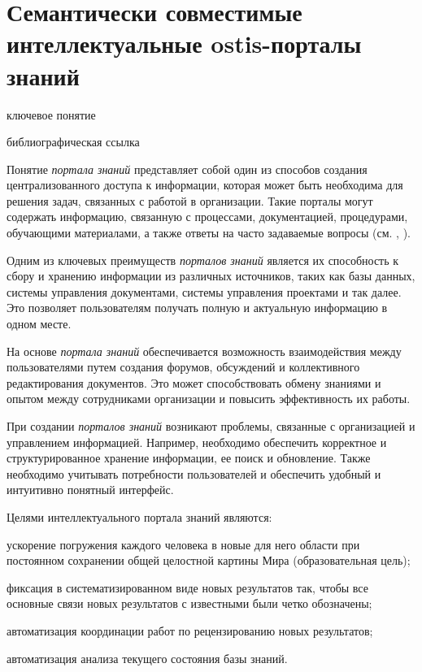 \section{Семантически совместимые интеллектуальные ostis-порталы знаний}
{\label{sec_ostis_scientific_portal}} 

\begin{SCn}

\bigskip

\begin{scnrelfromlist}{ключевое понятие}
\end{scnrelfromlist}


\begin{scnrelfromlist}{библиографическая ссылка}
\end{scnrelfromlist}

\end{SCn}

Понятие \textit{портала знаний} представляет собой один из способов создания централизованного доступа к информации, которая может быть необходима для решения задач, связанных с работой в организации. Такие порталы могут содержать информацию, связанную с процессами, документацией, процедурами, обучающими материалами, а также ответы на часто задаваемые вопросы (см. , ).

Одним из ключевых преимуществ \textit{порталов знаний} является их способность к сбору и хранению информации из различных источников, таких как базы данных, системы управления документами, системы управления проектами и так далее. Это позволяет пользователям получать полную и актуальную информацию в одном месте.

На основе \textit{портала знаний} обеспечивается возможность взаимодействия между пользователями путем создания форумов, обсуждений и коллективного редактирования документов. Это может способствовать обмену знаниями и опытом между сотрудниками организации и повысить эффективность их работы.

При создании \textit{порталов знаний} возникают проблемы, связанные с организацией и управлением информацией. Например, необходимо обеспечить корректное и структурированное хранение информации, ее поиск и обновление. Также необходимо учитывать потребности пользователей и обеспечить удобный и интуитивно понятный интерфейс.

Целями интеллектуального портала знаний являются:
\begin{textitemize}
    \item ускорение погружения каждого человека в новые для него области при постоянном сохранении общей целостной картины Мира (образовательная цель);
    \item фиксация в систематизированном виде новых результатов так, чтобы все основные связи новых результатов с известными были четко обозначены;
    \item автоматизация координации работ по рецензированию новых результатов;
    \item автоматизация анализа текущего состояния базы знаний.
\end{textitemize}

